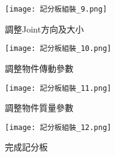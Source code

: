 {\begin{figure}[hbt!]
  \begin{center}
    \texttt{[image: 記分板組裝\_9.png]}
  \end{center}
  \caption{調整Joint方向及大小}
  \label{fig:photo}
\end{figure}

\begin{figure}[hbt!]
  \begin{center}
    \texttt{[image: 記分板組裝\_10.png]}
  \end{center}
  \caption{調整物件傳動參數}
  \label{fig:photo}
\end{figure}

\begin{figure}[hbt!]
  \begin{center}
    \texttt{[image: 記分板組裝\_11.png]}
  \end{center}
  \caption{調整物件質量參數}
  \label{fig:photo}
\end{figure}

\begin{figure}[hbt!]
  \begin{center}
    \texttt{[image: 記分板組裝\_12.png]}
  \end{center}
  \caption{完成記分板}
  \label{fig:photo}
\end{figure}
}
